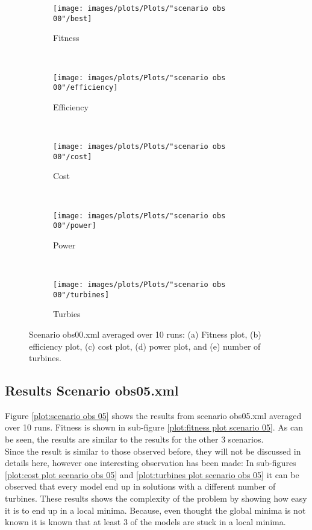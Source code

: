 \begin{figure}[h!]
    \centering
      \begin{subfigure}[b]{0.45\textwidth}
        \texttt{[image: images/plots/Plots/"scenario obs 00"/best]}
        \caption{Fitness}
        \hfill
        \label{plot:fitness plot scenario obs 00}
    \end{subfigure}
    ~
      \begin{subfigure}[b]{0.45\textwidth}
        \texttt{[image: images/plots/Plots/"scenario obs 00"/efficiency]}
        \caption{Efficiency}
        \hfill
        \label{plot:efficiency plot scenario obs 00}
    \end{subfigure}
    ~
    \begin{subfigure}[b]{0.45\textwidth}
        \texttt{[image: images/plots/Plots/"scenario obs 00"/cost]}
        \caption{Cost}
        \hfill
        \label{plot:cost plot scenario obs 00}
    \end{subfigure}
    ~
    \begin{subfigure}[b]{0.45\textwidth}
        \texttt{[image: images/plots/Plots/"scenario obs 00"/power]}
        \caption{Power}
        \hfill
        \label{plot:power plot scenario obs 00}
    \end{subfigure}
    ~
    \begin{subfigure}[b]{0.45\textwidth}
        \texttt{[image: images/plots/Plots/"scenario obs 00"/turbines]}
        \caption{Turbies}
        \hfill
        \label{plot:turbines plot scenario obs 00}
    \end{subfigure}
    \caption{Scenario obs00.xml averaged over 10 runs: (a) Fitness plot, (b) efficiency plot, (c) cost plot, (d) power plot, and (e) number of turbines.}
    \label{plot:scenario obs 00}
\end{figure}


\subsection{Results Scenario obs05.xml}


\noindent Figure \ref{plot:scenario obs 05} shows the results from scenario obs05.xml averaged over 10 runs. Fitness is shown in sub-figure \ref{plot:fitness plot scenario 05}. As can be seen, the results are similar to the results for the other 3 scenarios.\\


\noindent Since the result is similar to those observed before, they will not be discussed in details here, however one interesting observation has been made: In sub-figures \ref{plot:cost plot scenario obs 05} and \ref{plot:turbines plot scenario obs 05} it can be observed that every model end up in solutions with a different number of turbines. These results shows the complexity of the problem by showing how easy it is to end up in a local minima. Because, even thought the global minima is not known it is known that at least 3 of the models are stuck in a local minima.  \\


